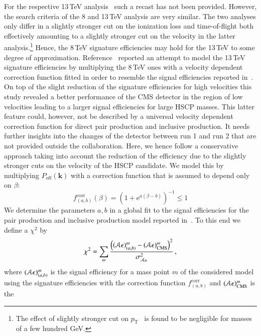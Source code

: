 \documentclass[preprint,number,sort&compress,twocolumn,3p]{elsstyarticle}
\renewcommand{\vec}[1]{\boldsymbol{#1}}
\newcommand{\E}{\mathrm{e}}
\begin{document}
\begin{appendix}
For the respective 13\,TeV analysis~\cite{CMS-PAS-EXO-16-036} such a recast has not been
provided. However, the search criteria of the 8 and 13\,TeV analysis are very similar. The
two analyses only differ in a slightly stronger cut on the ionization loss and time-of-flight both effectively amounting
to a slightly stronger cut on the velocity in the latter analysis.\footnote{The effect of slightly stronger cut on $p_\text{T}$~\cite{CMS-PAS-EXO-16-036} is found to be negligible for masses of a few hundred GeV.}
Hence, the 8\,TeV 
signature efficiencies may hold for the 13\,TeV to some degree of approximation. Reference~\cite{Brooijmans:2018xbu}
reported an attempt to model the 13\,TeV signature efficiencies by multiplying the 8\,TeV ones with
a velocity dependent correction function fitted in order to resemble the signal efficiencies reported in~\cite{CMS-PAS-EXO-16-036}.
On top of the slight reduction of the signature efficiencies for high velocities this study revealed a better performance of the CMS detector in the region of low velocities leading to a larger signal efficiencies
for large HSCP masses. This latter feature could, however, not be described by a universal velocity dependent correction function for direct pair production and inclusive production. It
needs further insights into the changes of the detector between run 1 and run 2 that are not provided outside the collaboration. Here, we hence
follow a conservative approach taking into account the reduction of the efficiency due to the slightly
stronger cuts on the velocity of the HSCP candidate. 
We model this by multiplying $P_\text{off}(\vec{k})$ with a correction function that is assumed to depend only on $\beta$:
\begin{equation}
f_{(a,b)}^\text{corr}(\beta) = \left(1+\E^{a (\beta-b)}\right)^{-1}\le1
\end{equation}
We determine the parameters $a,b$ in a 
global fit to the signal efficiencies for the pair production and inclusive production model reported in~\cite{CMS-PAS-EXO-16-036}. 
To this end we define a $\chi^2$ by
\begin{equation}
\label{eq:chi2}
\chi^2 = \sum_m \frac{\left(({\cal A}\epsilon)^m_{(a,b)} - ({\cal A}\epsilon)^m_\text{CMS}\right)^2}{\sigma_{{\cal A}\epsilon}^2}\,,
\end{equation}
where $({\cal A}\epsilon)^m_{(a,b)}$ is the signal efficiency for a mass point $m$ of the considered model
using the signature efficiencies with the correction function $f_{(a,b)}^\text{corr}$ and $({\cal A}\epsilon)^m_\text{CMS}$ is the 

\end{appendix}
\end{document}
